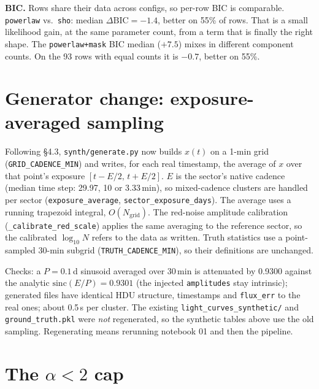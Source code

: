 \documentclass[11pt]{article}
\newcommand{\code}[1]{\texttt{#1}}
\begin{document}
\textbf{BIC.} Rows share their data across configs, so per-row BIC is comparable.
\code{powerlaw} vs.\ \code{sho}: median $\Delta\mathrm{BIC} = -1.4$, better on 55\% of
rows. That is a small likelihood gain, at the same parameter count, from a term that is
finally the right shape. The \code{powerlaw+mask} BIC median ($+7.5$) mixes in different
component counts. On the 93 rows with equal counts it is $-0.7$, better on 55\%.

\section{Generator change: exposure-averaged sampling}

Following \S4.3, \code{synth/generate.py} now builds $x(t)$ on a 1-min grid
(\code{GRID\_CADENCE\_MIN}) and writes, for each real timestamp, the average of $x$ over
that point's exposure $[t-E/2,\,t+E/2]$. $E$ is the sector's native cadence (median time
step: 29.97, 10 or 3.33\,min), so mixed-cadence clusters are handled per sector
(\code{exposure\_average}, \code{sector\_exposure\_days}). The average uses a running
trapezoid integral, $O(N_\mathrm{grid})$. The red-noise amplitude calibration
(\code{\_calibrate\_red\_scale}) applies the same averaging to the reference sector,
so the calibrated $\log_{10}N$ refers to the data as written. Truth statistics use a
point-sampled 30-min subgrid (\code{TRUTH\_CADENCE\_MIN}), so their definitions are
unchanged.

Checks: a $P=0.1$\,d sinusoid averaged over 30\,min is attenuated by 0.9300 against the
analytic $\mathrm{sinc}(E/P) = 0.9301$ (the injected \code{amplitudes} stay intrinsic);
generated files have identical HDU structure, timestamps and \code{flux\_err} to the real
ones; about 0.5\,s per cluster. The existing \code{light\_curves\_synthetic/} and
\code{ground\_truth.pkl} were \emph{not} regenerated, so the synthetic tables above use
the old sampling. Regenerating means rerunning notebook 01 and then the pipeline.

\section{The $\alpha < 2$ cap}
\end{document}
